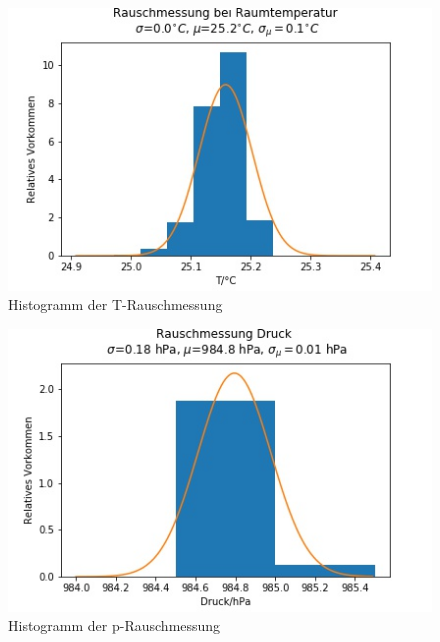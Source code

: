 \documentclass[]{article}
\begin{document}
\begin{figure}
	\begin{center}
		\includegraphics[scale=0.9]{Images/RauschmessungRT_T_histo.jpg}
		\caption{Histogramm der T-Rauschmessung}
		\label{RM_T_histo}
	\end{center}
\end{figure}
\begin{figure}
	\begin{center}
		\includegraphics[scale=0.9]{Images/RauschmessungRT_p_histo.jpg}
		\caption{Histogramm der p-Rauschmessung}
		\label{RM_p_histo}
	\end{center}
\end{figure}
\end{document}
